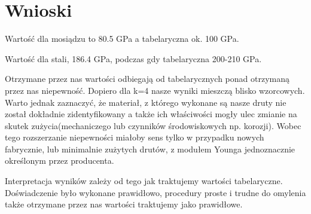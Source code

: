 \documentclass{article}
\begin{document}
\section{Wnioski}
Wartość dla mosiądzu to 80.5 GPa a tabelaryczna ok. 100 GPa.

Wartość dla stali, 186.4 GPa, podczas gdy tabelaryczna 200-210 GPa.

Otrzymane przez nas wartości odbiegają od tabelarycznych ponad otrzymaną przez nas niepewność. Dopiero dla k=4 nasze wyniki mieszczą blisko wzorcowych. Warto jednak zaznaczyć, że materiał, z którego wykonane są nasze druty nie został dokładnie zidentyfikowany a także ich właściwości mogły ulec zmianie na skutek zużycia(mechaniczego lub czynników środowiskowych np. korozji). Wobec tego rozszerzanie niepewności miałoby sens tylko w przypadku nowych fabrycznie, lub minimalnie zużytych drutów, z modułem Younga jednoznacznie określonym przez producenta.

Interpretacja wyników zależy od tego jak traktujemy wartości tabelaryczne. Doświadczenie było wykonane prawidłowo, procedury proste i trudne do omylenia także otrzymane przez nas wartości traktujemy jako prawidłowe.





\end{document}
